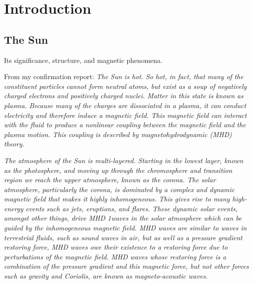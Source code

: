 \documentclass[12pt]{../style-files/ociamthesis}
\begin{document}
\baselineskip=18pt

\setcounter{secnumdepth}{3}
\setcounter{tocdepth}{3}

\newcommand{\bv}{\mathbf{v}}
\newcommand{\bB}{\mathbf{B}}


\chapter{Introduction}
\label{chap:intro}

\section{The Sun}
\label{sec: sun}

Its significance, structure, and magnetic phenomena.

From my confirmation report:
\textit{The Sun is hot. So hot, in fact, that many of the constituent particles cannot form
	neutral atoms, but exist as a soup of negatively charged electrons and positively
	charged nuclei. Matter in this state is known as plasma. Because many of the charges
	are dissociated in a plasma, it can conduct electricity and therefore induce a magnetic
	field. This magnetic field can interact with the fluid to produce a nonlinear coupling
	between the magnetic field and the plasma motion. This coupling is described by
	magnetohydrodynamic (MHD) theory.}

\textit{The atmosphere of the Sun is multi-layered. Starting in the lowest layer, known as
	the photosphere, and moving up through the chromosphere and transition region we
	reach the upper atmosphere, known as the corona. The solar atmosphere, particularly
	the corona, is dominated by a complex and dynamic magnetic field that makes it
	highly inhomogeneous. This gives rise to many high-energy events such as jets,
	eruptions, and flares. These dynamic solar events, amongst other things, drive MHD
	1waves in the solar atmosphere which can be guided by the inhomogeneous magnetic
	field. MHD waves are similar to waves in terrestrial fluids, such as sound waves in
	air, but as well as a pressure gradient restoring force, MHD waves owe their existence
	to a restoring force due to perturbations of the magnetic field. MHD waves whose
	restoring force is a combination of the pressure gradient and this magnetic force, but
	not other forces such as gravity and Coriolis, are known as magneto-acoustic waves.}
\end{document}
